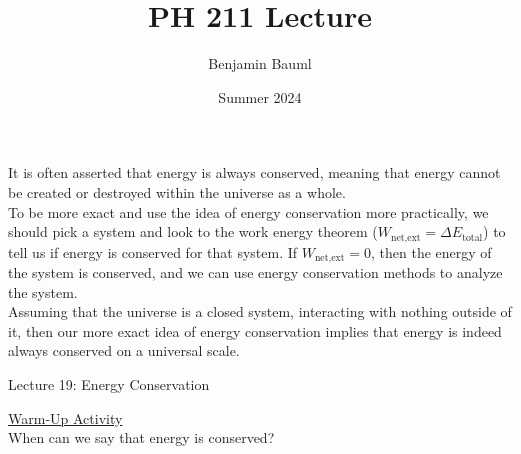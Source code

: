 \documentclass[]{article}
\title{PH 211 Lecture \Week}
\author{Benjamin Bauml}
\date{Summer 2024}
\newcommand{\Week}{19}
\begin{document}
\begin{TeacherMargin}
\noindent It is often asserted that energy is always conserved, meaning that energy cannot be created or destroyed within the universe as a whole. \\

\noindent To be more exact and use the idea of energy conservation more practically, we should pick a system and look to the work energy theorem ($W_{\text{net,ext}}=\Delta E_{\text{total}}$) to tell us if energy is conserved for that system. If $W_{\text{net,ext}}=0$, then the energy of the system is conserved, and we can use energy conservation methods to analyze the system. \\

\noindent Assuming that the universe is a closed system, interacting with nothing outside of it, then our more exact idea of energy conservation implies that energy is indeed always conserved on a universal scale.
\end{TeacherMargin}
\begin{PresentSpace}
\begin{center}
	\huge Lecture \Week: Energy Conservation
\end{center}
\vspace{0.5cm}
\underline{Warm-Up Activity} \\
When can we say that energy is conserved?
\end{PresentSpace}
\newpage
\end{document}
